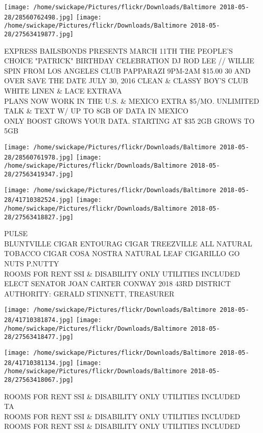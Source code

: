 \documentclass[10pt,letterpaper]{article}
\begin{document}
\vspace{0.25in}
\texttt{[image: /home/swickape/Pictures/flickr/Downloads/Baltimore 2018-05-28/28560762498.jpg]}
\texttt{[image: /home/swickape/Pictures/flickr/Downloads/Baltimore 2018-05-28/27563419877.jpg]}

EXPRESS BAILSBONDS PRESENTS MARCH 11TH THE PEOPLE'S CHOICE "PATRICK" BIRTHDAY CELEBRATION DJ ROD LEE // WILLIE SPIN FROM LOS ANGELES CLUB PAPPARAZI 9PM{-}2AM \$15.00 30 AND OVER SAVE THE DATE JULY 30, 2016 CLEAN \& CLASSY BOY'S CLUB WHITE LINEN \& LACE EXTRAVA\\
PLANS NOW WORK IN THE U.S. \& MEXICO EXTRA \$5/MO. UNLIMITED TALK \& TEXT W/ UP TO 8GB OF DATA IN MEXICO\\
ONLY BOOST GROWS YOUR DATA.  STARTING AT \$35 2GB GROWS TO 5GB\\
\pagebreak

\texttt{[image: /home/swickape/Pictures/flickr/Downloads/Baltimore 2018-05-28/28560761978.jpg]}
\texttt{[image: /home/swickape/Pictures/flickr/Downloads/Baltimore 2018-05-28/27563419347.jpg]}

\texttt{[image: /home/swickape/Pictures/flickr/Downloads/Baltimore 2018-05-28/41710382524.jpg]}
\texttt{[image: /home/swickape/Pictures/flickr/Downloads/Baltimore 2018-05-28/27563418827.jpg]}

PULSE\\
BLUNTVILLE CIGAR ENTOURAG CIGAR TREEZVILLE ALL NATURAL TOBACCO CIGAR COSA NOSTRA NATURAL LEAF CIGARILLO GO NUTS P.NUTTY\\
ROOMS FOR RENT SSI \& DISABILITY ONLY UTILITIES INCLUDED\\
ELECT SENATOR JOAN CARTER CONWAY 2018 43RD DISTRICT AUTHORITY: GERALD STINNETT, TREASURER\\
\pagebreak

\texttt{[image: /home/swickape/Pictures/flickr/Downloads/Baltimore 2018-05-28/41710381874.jpg]}
\texttt{[image: /home/swickape/Pictures/flickr/Downloads/Baltimore 2018-05-28/27563418477.jpg]}

\texttt{[image: /home/swickape/Pictures/flickr/Downloads/Baltimore 2018-05-28/41710381134.jpg]}
\texttt{[image: /home/swickape/Pictures/flickr/Downloads/Baltimore 2018-05-28/27563418067.jpg]}

ROOMS FOR RENT SSI \& DISABILITY ONLY UTILITIES INCLUDED\\
TA\\
ROOMS FOR RENT SSI \& DISABILITY ONLY UTILITIES INCLUDED\\
ROOMS FOR RENT SSI \& DISABILITY ONLY UTILITIES INCLUDED\\
\pagebreak
\end{document}
